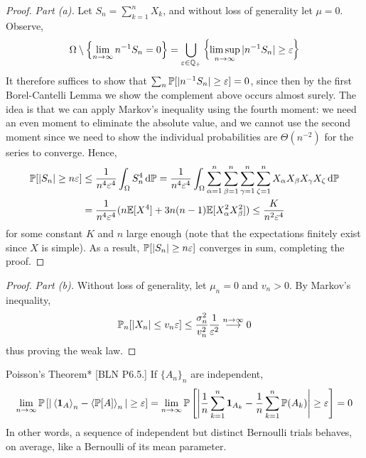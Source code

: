 \begin{proof}
    \emph{Part (a).} Let \(S_n = \sum_{k=1}^n X_k\), and without loss of generality let \(\mu = 0\). Observe, 
    \[
        \Omega \setminus \left\{\lim_{n \to \infty} n^{-1} S_n = 0\right\} 
        = \bigcup_{\varepsilon \in \mathbb{Q}_+} \left\{\limsup_{n \to \infty} |n^{-1} S_n| \geq \varepsilon \right\}
    \]
    It therefore suffices to show that \(\sum_n \mathbb{P}[|n^{-1} S_n| \geq \varepsilon] = 0\), since then by the first Borel-Cantelli Lemma we show the complement above occurs almost surely. The idea is that we can apply Markov's inequality using the fourth moment: we need an even moment to eliminate the absolute value, and we cannot use the second moment since we need to show the individual probabilities are \(\Theta(n^{-2})\) for the series to converge. Hence,
    \begin{align*}
        \mathbb{P}[|S_n| \geq n \varepsilon]
        &\leq \frac{1}{n^4 \varepsilon^4} \int_{\Omega} S_n^4 \, \mathrm{d}\mathbb{P} 
        = \frac{1}{n^4 \varepsilon^4} \int_{\Omega} \sum_{\alpha=1}^n \sum_{\beta=1}^n \sum_{\gamma=1}^n \sum_{\zeta=1}^n X_\alpha X_\beta X_\gamma X_\zeta \, \mathrm{d}\mathbb{P} \\
        &= \frac{1}{n^4 \varepsilon^4} (n \mathbb{E}[X^4] + 3n(n-1) \mathbb{E}[X_\alpha^2 X_\beta^2])
        \leq \frac{K}{n^2 \varepsilon^4}
    \end{align*}
    for some constant \(K\) and \(n\) large enough (note that the expectations finitely exist since \(X\) is simple). As a result, \(\mathbb{P}[|S_n| \geq n \varepsilon]\) converges in sum, completing the proof. 
\end{proof}

\begin{proof}
    \emph{Part (b).} Without loss of generality, let \(\mu_n = 0\) and \(v_n > 0\). By Markov's inequality, 
    \[
        \mathbb{P}_n[|X_n| \leq v_n \varepsilon]
        \leq \frac{\sigma_n^2}{v_n^2} \frac{1}{\varepsilon^2} \stackrel{n \to \infty}{\longrightarrow} 0
    \]
    thus proving the weak law. 
\end{proof}


\begin{problem}{Poisson's Theorem}*
    [BLN P6.5.] If \(\{A_n\}_n\) are independent,
    \[
        \lim_{n \to \infty} \bb{P}\left[ |\ev{\mb{1}_A}_n - \ev{\bb{P}[A]}_n | \geq \varepsilon \right]
        = \lim_{n \to \infty} \bb{P}\left[ \left| \frac{1}{n} \sum_{k=1}^n \mb{1}_{A_k} - \frac{1}{n} \sum_{k=1}^n \bb{P}(A_k) \right| \geq \varepsilon \right] 
        = 0
    \]
    In other words, a sequence of independent but distinct Bernoulli trials behaves, on average, like a Bernoulli of its mean parameter.
\end{problem}

